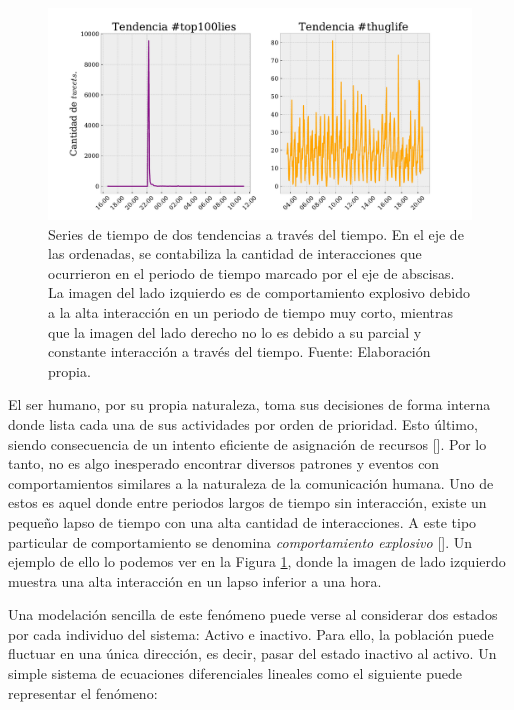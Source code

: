 \documentclass[../main.tex]{subfiles}
\begin{document}
\begin{figure}[h!]
    \centering
    \includegraphics[scale = 0.55]{images/introduction_timeserie.pdf}
    \caption{Series de tiempo de dos tendencias a través del tiempo. En el eje de las ordenadas, se contabiliza la cantidad de interacciones que ocurrieron en el periodo de tiempo marcado por el eje de abscisas. La imagen del lado izquierdo es de comportamiento explosivo debido a la alta interacción en un periodo de tiempo muy corto, mientras que la imagen del lado derecho no lo es debido a su parcial y constante interacción a través del tiempo. Fuente: Elaboración propia.}
    \label{fig:introducction_timeserie_example}
\end{figure}


El ser humano, por su propia naturaleza, toma sus decisiones de forma interna donde lista cada una de sus actividades por orden de prioridad. Esto último, siendo consecuencia de un intento eficiente de asignación de recursos [\cite{Barabsi2005}]. Por lo tanto, no es algo inesperado encontrar diversos patrones y eventos con comportamientos similares a la naturaleza de la comunicación humana. Uno de estos es aquel donde entre periodos largos de tiempo sin interacción, existe un pequeño lapso de tiempo con una alta cantidad de interacciones. A este tipo particular de comportamiento se denomina \textit{comportamiento explosivo} [\cite{oka2014fluctuation}]. Un ejemplo de ello lo podemos ver en la Figura \ref{fig:introducction_timeserie_example}, donde la imagen de lado izquierdo muestra una alta interacción en un lapso inferior a una hora.

Una modelación sencilla de este fenómeno puede verse al considerar dos estados por cada individuo del sistema: Activo e inactivo. Para ello, la población puede fluctuar en una única dirección, es decir, pasar del estado inactivo al activo. Un simple sistema de ecuaciones diferenciales lineales como el siguiente puede representar el fenómeno:
\end{document}
